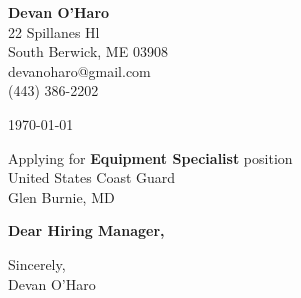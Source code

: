 \documentclass[12pt]{article}
\makeatletter
\newcommand{\yourname}{Devan O'Haro}
\newcommand{\youraddress}{22 Spillanes Hl}
\newcommand{\yourcitystatezip}{South Berwick, ME 03908}
\newcommand{\youremail}{devanoharo@gmail.com}
\newcommand{\yourphone}{(443) 386-2202}
\newcommand{\dateofletter}{\today}
\newcommand{\recipient}{Hiring Manager}
\newcommand{\companyname}{United States Coast Guard}
\newcommand{\companycitystatezip}{Glen Burnie, MD}
\newcommand{\job}{Equipment Specialist}
\makeatother
\begin{document}
\noindent
\begin{minipage}[t]{0.6\textwidth}
    \textbf{\yourname} \\
    \youraddress \\
    \yourcitystatezip \\
    \youremail \\
    \yourphone
\end{minipage}%
\hfill
\begin{minipage}[t]{0.35\textwidth}
    \raggedleft
    \dateofletter
\end{minipage}
\vspace{2em}

\noindent
Applying for \textbf{\job} position\\
\companyname \\
\companycitystatezip \\
\vspace{2em}

\noindent
\textbf{Dear \recipient,} \\
\vspace{1em}

\noindent
\vspace{1em}

\noindent
Sincerely, \\
\vspace{2em}
\yourname
\end{document}
